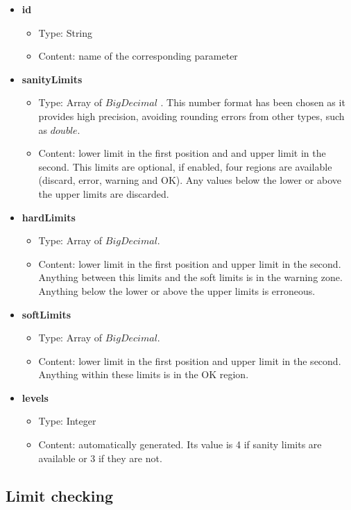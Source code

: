\begin{itemize}
	\item \textbf{id}
		\begin{itemize}
			\item Type: String
			\item Content: name of the corresponding parameter
		\end{itemize}
	\item \textbf{sanityLimits}
		\begin{itemize}
			\item Type: Array of $BigDecimal$ \cite{BigDecimal}. This number format has been chosen as it provides high precision, avoiding rounding errors from other types, such as $double$.
			\item Content: lower limit in the first position and and upper limit in the second. This limits are optional, if enabled, four regions are available (discard, error, warning and OK). Any values below the lower or above the upper limits are discarded.
		\end{itemize}
	\item \textbf{hardLimits}
		\begin{itemize}
			\item Type: Array of $BigDecimal$.
			\item Content: lower limit in the first position and upper limit in the second. Anything between this limits and the soft limits is in the warning zone. Anything below the lower or above the upper limits is erroneous.
		\end{itemize}
	\item \textbf{softLimits}
		\begin{itemize}
			\item Type: Array of $BigDecimal$.
			\item Content: lower limit in the first position and upper limit in the second. Anything within these limits is in the OK region.
		\end{itemize}
		
	\item \textbf{levels}
		\begin{itemize}
			\item Type: Integer
			\item Content: automatically generated. Its value is 4 if sanity limits are available or 3 if they are not.
		\end{itemize}
\end{itemize}
\pagebreak

\subsection{Limit checking}

